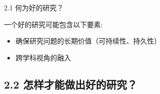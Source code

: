 \documentclass[10pt,aspectratio=43,mathserif,table]{beamer}
\begin{document}
\begin{frame}{\small 2.1 何为好的研究？}
\begin{block}{\footnotesize 一个好的研究可能包含以下要素:}
\begin{itemize}
			\begin{itemize}
				\item \footnotesize 确保研究问题的长期价值（可持续性、持久性）
			\end{itemize}
			
			\begin{itemize}
				\item \footnotesize 跨学科视角的融入
			\end{itemize}
		
		\end{itemize}
	\end{block}
	
\end{frame}



\subsection{2.2 怎样才能做出好的研究？}
\end{document}
